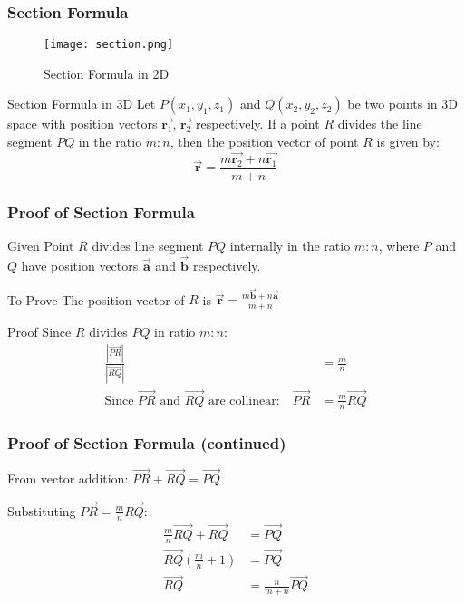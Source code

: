 \begin{frame}
    \frametitle{Section Formula}
    \begin{figure}
        \texttt{[image: section.png]}
        \caption{Section Formula in 2D}
    \end{figure} 
\end{frame}


\begin{frame}
    \begin{block}{Section Formula in 3D}
    Let \(P(x_1, y_1, z_1)\) and \(Q(x_2, y_2, z_2)\) be two points in 3D space with position vectors \( \vec{\mathbf{r}_1} \), \( \vec{\mathbf{r}_2} \) respectively. If a point \(R\) divides the line segment \(PQ\) in the ratio \(m:n\), then the position vector of point \(R\) is given by:
    \[
    \vec{\mathbf{r}} = \frac{m\vec{\mathbf{r}_2} + n\vec{\mathbf{r}_1}}{m+n}
    \]
    \end{block}
\end{frame}

\begin{frame}
    \frametitle{Proof of Section Formula}
    \begin{block}{Given}
    Point \(R\) divides line segment \(PQ\) internally in the ratio \(m:n\), where \(P\) and \(Q\) have position vectors \(\vec{\mathbf{a}}\) and \(\vec{\mathbf{b}}\) respectively.
    \end{block}
    
    \begin{block}{To Prove}
    The position vector of \(R\) is \(\vec{\mathbf{r}} = \frac{m\vec{\mathbf{b}} + n\vec{\mathbf{a}}}{m+n}\)
    \end{block}
    
    \begin{block}{Proof}
    Since \(R\) divides \(PQ\) in ratio \(m:n\):
    \begin{align}
        \frac{|\vec{PR}|}{|\vec{RQ}|} &= \frac{m}{n} \\
        \text{Since } \vec{PR} \text{ and } \vec{RQ} \text{ are collinear:} \quad \vec{PR} &= \frac{m}{n}\vec{RQ}
    \end{align}
    \end{block}
\end{frame}

\begin{frame}
    \frametitle{Proof of Section Formula (continued)}
    
    From vector addition: \(\vec{PR} + \vec{RQ} = \vec{PQ}\)
    
    Substituting \(\vec{PR} = \frac{m}{n}\vec{RQ}\):
    \begin{align}
        \frac{m}{n}\vec{RQ} + \vec{RQ} &= \vec{PQ} \\
        \vec{RQ}\left(\frac{m}{n} + 1\right) &= \vec{PQ} \\
        \vec{RQ} &= \frac{n}{m+n}\vec{PQ}
    \end{align}

\end{frame}


